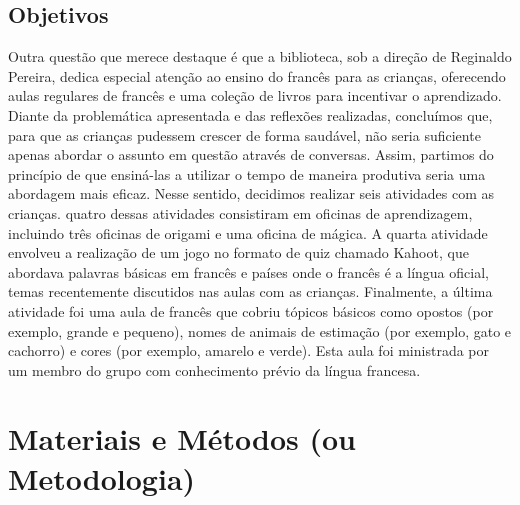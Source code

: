 \documentclass[a4paper,12pt]{article}
\begin{document}
\newpage

\subsection{\Large{Objetivos}}
Outra questão que merece destaque é que a biblioteca, sob a direção de Reginaldo Pereira, dedica especial atenção ao ensino do francês para as crianças, oferecendo aulas regulares de francês e uma coleção de livros para incentivar o aprendizado. \vspace{0.3cm}\\
Diante da problemática apresentada e das reflexões realizadas, concluímos que, para que as crianças pudessem crescer de forma saudável, não seria suficiente apenas abordar o assunto em questão através de conversas. Assim, partimos do princípio de que ensiná-las a utilizar o tempo de maneira produtiva seria uma abordagem mais eficaz. Nesse sentido, decidimos realizar seis atividades com as crianças. quatro dessas atividades consistiram em oficinas de aprendizagem, incluindo três oficinas de origami e uma oficina de mágica. A quarta atividade envolveu a realização de um jogo no formato de quiz chamado Kahoot, que abordava palavras básicas em francês e países onde o francês é a língua oficial, temas recentemente discutidos nas aulas com as crianças. Finalmente, a última atividade foi uma aula de francês que cobriu tópicos básicos como opostos (por exemplo, grande e pequeno), nomes de animais de estimação (por exemplo, gato e cachorro) e cores (por exemplo, amarelo e verde). Esta aula foi ministrada por um membro do grupo com conhecimento prévio da língua francesa.\\

\section{\LARGE{Materiais e Métodos (ou Metodologia)}}
\vspace{0.5cm}
\end{document}
